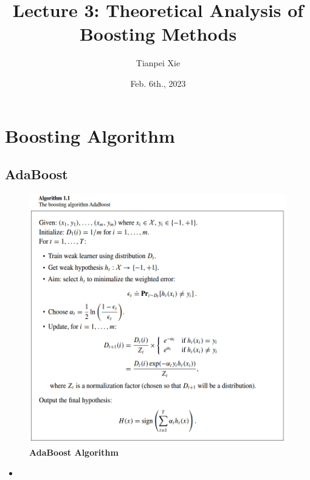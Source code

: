 \documentclass[11pt]{article}
\begin{document}
\title{Lecture 3:  Theoretical Analysis of Boosting Methods}
\author{ Tianpei Xie}
\date{Feb. 6th., 2023}
\maketitle
\tableofcontents
\newpage
\section{Boosting Algorithm}
\subsection{AdaBoost}
\begin{figure}
\begin{minipage}[t]{1\linewidth}
  \centering
  \centerline{\includegraphics[scale = 0.4]{adaboost.png}}
\end{minipage}
\caption{\footnotesize{\textbf{AdaBoost Algorithm \citep{schapire2012boosting}}}}
\label{fig: adaboost}
\end{figure}

\begin{itemize}
\item 


\end{itemize}
\end{document}
